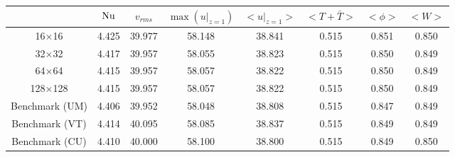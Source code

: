 \begin{tabular}{c|ccccccc}
    & $\mathrm{Nu}$ & $v_{rms}$ & $\max(u|_{z=1})$ & $<u|_{z=1}>$ & $<T + \bar{T}>$ & $<\phi>$ & $<W>$ \\
\hline
16$\times$16 & 4.425 & 39.977 & 58.148 & 38.841 & 0.515 & 0.851 & 0.850 \\
32$\times$32 & 4.417 & 39.957 & 58.055 & 38.823 & 0.515 & 0.850 & 0.849 \\
64$\times$64 & 4.415 & 39.957 & 58.057 & 38.822 & 0.515 & 0.850 & 0.849 \\
128$\times$128 & 4.415 & 39.957 & 58.057 & 38.822 & 0.515 & 0.850 & 0.849 \\
\hline
Benchmark (UM) & 4.406 & 39.952 & 58.048 & 38.808 & 0.515 & 0.847 & 0.849 \\
Benchmark (VT) & 4.414 & 40.095 & 58.085 & 38.837 & 0.515 & 0.849 & 0.849 \\
Benchmark (CU) & 4.410 & 40.000 & 58.100 & 38.800 & 0.515 & 0.849 & 0.850 \\
\end{tabular}
